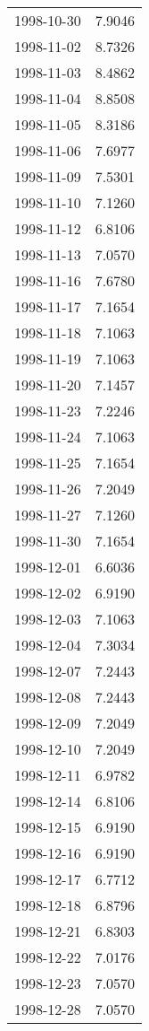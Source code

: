 \begin{tabular}{lr}
1998-10-30 &      7.9046 \\
1998-11-02 &      8.7326 \\
1998-11-03 &      8.4862 \\
1998-11-04 &      8.8508 \\
1998-11-05 &      8.3186 \\
1998-11-06 &      7.6977 \\
1998-11-09 &      7.5301 \\
1998-11-10 &      7.1260 \\
1998-11-12 &      6.8106 \\
1998-11-13 &      7.0570 \\
1998-11-16 &      7.6780 \\
1998-11-17 &      7.1654 \\
1998-11-18 &      7.1063 \\
1998-11-19 &      7.1063 \\
1998-11-20 &      7.1457 \\
1998-11-23 &      7.2246 \\
1998-11-24 &      7.1063 \\
1998-11-25 &      7.1654 \\
1998-11-26 &      7.2049 \\
1998-11-27 &      7.1260 \\
1998-11-30 &      7.1654 \\
1998-12-01 &      6.6036 \\
1998-12-02 &      6.9190 \\
1998-12-03 &      7.1063 \\
1998-12-04 &      7.3034 \\
1998-12-07 &      7.2443 \\
1998-12-08 &      7.2443 \\
1998-12-09 &      7.2049 \\
1998-12-10 &      7.2049 \\
1998-12-11 &      6.9782 \\
1998-12-14 &      6.8106 \\
1998-12-15 &      6.9190 \\
1998-12-16 &      6.9190 \\
1998-12-17 &      6.7712 \\
1998-12-18 &      6.8796 \\
1998-12-21 &      6.8303 \\
1998-12-22 &      7.0176 \\
1998-12-23 &      7.0570 \\
1998-12-28 &      7.0570 \\

\end{tabular}
